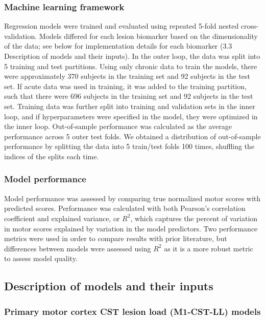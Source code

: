 \documentclass[10pt]{article}
\begin{document}
\subsubsection*{Machine learning framework}
Regression models were trained and evaluated using repeated 5-fold nested cross-validation. Models differed for each lesion biomarker based on the dimensionality of the data; see below for implementation details for each biomarker (3.3 Description of models and their inputs). In the outer loop, the data was split into 5 training and test partitions. Using only chronic data to train the models, there were approximately 370 subjects in the training set and 92 subjects in the test set. If acute data was used in training, it was added to the training partition, such that there were 696 subjects in the training set and 92 subjects in the test set. Training data was further split into training and validation sets in the inner loop, and if hyperparameters were specified in the model, they were optimized in the inner loop. Out-of-sample performance was calculated as the average performance across 5 outer test folds. We obtained a distribution of out-of-sample performance by splitting the data into 5 train/test folds 100 times, shuffling the indices of the splits each time. 

\subsubsection*{Model performance}
Model performance was assessed by comparing true normalized motor scores with predicted scores. Performance was calculated with both Pearson's correlation coefficient and explained variance, or $R^2$, which captures the percent of variation in motor scores explained by variation in the model predictors. Two performance metrics were used in order to compare results with prior literature, but differences between models were assessed using $R^2$ as it is a more robust metric to assess model quality. 

\subsection{Description of models and their inputs}
\subsubsection*{Primary motor cortex CST lesion load (M1-CST-LL) models}
\end{document}
